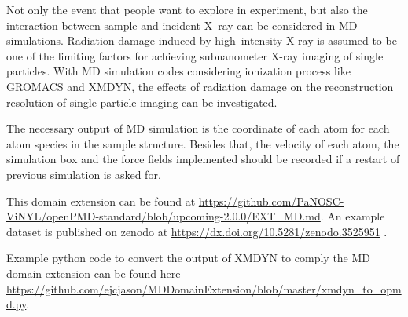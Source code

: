 \documentclass[11pt, a4paper]{article}
\begin{document}
Not only the event that people want to explore in experiment, but also the interaction between sample and incident X--ray can be considered
in MD simulations. Radiation damage induced by high--intensity X-ray is assumed to be one of the limiting factors
for achieving subnanometer X-ray imaging of single particles\cite{caleman2011acsn}. With MD simulation codes considering ionization
process like GROMACS\cite{lindahl2001} and XMDYN\cite{jurek2016}, the effects of radiation damage on the reconstruction resolution
of single particle imaging can be investigated.

The necessary output of MD simulation is the coordinate of each atom for each atom species in the sample structure. Besides that, the velocity of each atom, 
the simulation box and the force fields implemented should be recorded if a restart of previous simulation is asked for.

This domain extension can be found at \url{https://github.com/PaNOSC-ViNYL/openPMD-standard/blob/upcoming-2.0.0/EXT_MD.md}.
An example dataset is published on zenodo at \url{https://dx.doi.org/10.5281/zenodo.3525951}
\cite{Juncheng:zenodo2019}.

Example python code to convert the output of XMDYN to comply the MD domain extension can be found here
\url{https://github.com/ejcjason/MDDomainExtension/blob/master/xmdyn_to_opmd.py}.
\printbibliography
\end{document}
